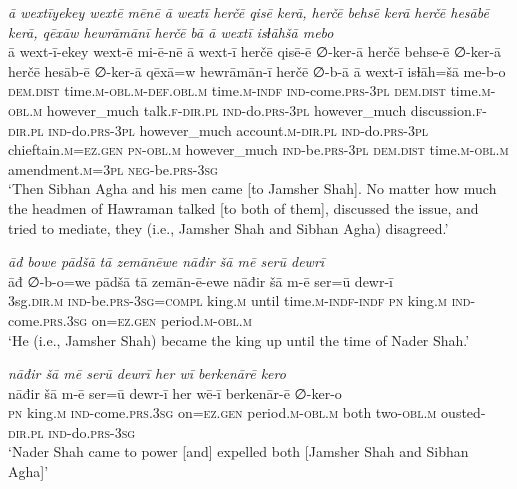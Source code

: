 \ea \label{DP.46}
\textit{ā wextīyekey wextē mēnē ā wextī herčē qisē kerā, herčē behsē kerā herčē hesābē kerā, qēxāw hewrāmānī herčē bā ā wextī isɫāhšā mebo} \\ 
\gll ā wext-ī-ekey wext-ē mi-ē-nē ā wext-ī herčē qisē-ē ∅-ker-ā herčē behse-ē ∅-ker-ā herčē hesāb-ē ∅-ker-ā qēxā=w hewrāmān-ī herčē ∅-b-ā ā wext-ī isɫāh=šā me-b-o \\ 
 \textsc{dem.dist} time\textsc{.m}\textsc{-obl}\textsc{.m}\textsc{-def}\textsc{.obl}\textsc{.m} time\textsc{.m}\textsc{-indf} \textsc{ind-}come\textsc{.prs}\textsc{-3pl} \textsc{dem.dist} time\textsc{.m}\textsc{-obl}\textsc{.m} however\_much talk\textsc{\textsc{.f}}\textsc{-dir}\textsc{.pl} \textsc{ind-}do\textsc{.prs}\textsc{-3pl} however\_much discussion\textsc{\textsc{.f}}\textsc{-dir}\textsc{.pl} \textsc{ind-}do\textsc{.prs}\textsc{-3pl} however\_much account\textsc{.m}\textsc{-dir}\textsc{.pl} \textsc{ind-}do\textsc{.prs}\textsc{-3pl} chieftain\textsc{.m}\textsc{=ez}\textsc{.gen} \textsc{pn}\textsc{-obl}\textsc{.m} however\_much \textsc{ind-}be\textsc{.prs}\textsc{-3pl} \textsc{dem.dist} time\textsc{.m}\textsc{-obl}\textsc{.m} amendment\textsc{.m}\textsc{=3pl} \textsc{neg-}be\textsc{.prs}\textsc{-3sg} \\ 
\glt `Then Sibhan Agha and his men came [to Jamsher Shah]. No matter how much the headmen of Hawraman talked [to both of them], discussed the issue, and tried to mediate, they (i.e., Jamsher Shah and Sibhan Agha) disagreed.'
\z 
 
\ea \label{DP.53}
\textit{āđ bowe pādšā tā zemānēwe nāđir šā mē serū dewrī} \\ 
\gll āđ ∅-b-o=we pādšā tā zemān-ē-ewe nāđir šā m-ē ser=ū dewr-ī \\ 
 3sg\textsc{.dir}\textsc{.m} \textsc{ind-}be\textsc{.prs}\textsc{-3sg}\textsc{=\textsc{compl}} king\textsc{.m} until time\textsc{.m}\textsc{-indf}\textsc{-indf} \textsc{pn} king\textsc{.m} \textsc{ind-}come\textsc{.prs}\textsc{.3sg} on\textsc{=ez}\textsc{.gen} period\textsc{.m}\textsc{-obl}\textsc{.m} \\ 
\glt `He (i.e., Jamsher Shah) became the king up until the time of Nader Shah.'
\z 
 
\ea \label{DP.54}
\textit{nāđir šā mē serū dewrī her wī berkenārē kero} \\ 
\gll nāđir šā m-ē ser=ū dewr-ī her wē-ī berkenār-ē ∅-ker-o \\ 
 \textsc{pn} king\textsc{.m} \textsc{ind-}come\textsc{.prs}\textsc{.3sg} on\textsc{=ez}\textsc{.gen} period\textsc{.m}\textsc{-obl}\textsc{.m} both two\textsc{-obl}\textsc{.m} ousted\textsc{-dir}\textsc{.pl} \textsc{ind-}do\textsc{.prs}\textsc{-3sg} \\ 
\glt `Nader Shah came to power [and] expelled both [Jamsher Shah and Sibhan Agha]'
\z 
 
